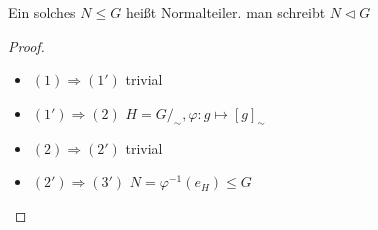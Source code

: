 \begin{definition}
    Ein solches $N \le G$ heißt Normalteiler. man schreibt $N\vartriangleleft G$
\end{definition}

\begin{proof}\phantom{.}
    \begin{itemize}[label={--}, topsep=0cm]
        \item $(1) \Rightarrow (1')$ trivial
        \item $(1') \Rightarrow (2)$ $H = G/_{\sim}, \varphi: g \mapsto [g]_\sim $
        \item $(2) \Rightarrow (2')$ trivial
        \item $(2') \Rightarrow (3')$ $N = \varphi^{-1}(e_H) \le G$
    \end{itemize}
\end{proof}
